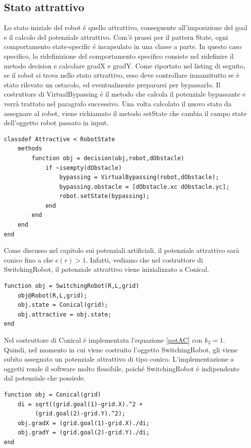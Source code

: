 \documentclass[14pt,a4paper]{extarticle}
\begin{document}
\subsection{Stato attrattivo}
Lo stato iniziale del robot é quello attrattivo, conseguente all'imposizione del goal e il calcolo del potenziale attrattivo. Com'è prassi per il pattern State, ogni comportamento state-specific é incapsulato in una classe a parte. In questo caso specifico, la ridefinizione del comportamento specifico consiste nel ridefinire il metodo decision e calcolare gradX e gradY. Come riportato nel listing di seguito, se il robot si trova nello stato attrattivo, esso deve controllare innanzitutto se è stato rilevato un ostacolo, ed eventualmente prepararsi per bypassarlo. Il costruttore di VirtualBypassing é il metodo che calcola il potenziale bypassante e verrà trattato nel paragrafo successivo. Una volta calcolato il nuovo stato da assegnare al robot, viene richiamato il metodo setState che cambia il campo state dell'oggetto robot passato in input. 
\begin{lstlisting}[caption=Classe astratta Attractive (erede di RobotState)]
classdef Attractive < RobotState
	methods
		function obj = decision(obj,robot,dObstacle)
			if ~isempty(dObstacle)
				bypassing = VirtualBypassing(robot,dObstacle);
				bypassing.obstacle = [dObstacle.xc dObstacle.yc];
				robot.setState(bypassing);
			end
		end
	end
end
\end{lstlisting}
Come discusso nel capitolo sui potenziali artificiali, il potenziale attrattivo sarà conico fino a che \(e(r) > 1\). Infatti, vediamo che nel costruttore di SwitchingRobot, il potenziale attrattivo viene inizializzato a Conical.
\begin{lstlisting}[caption=Costruttore di SwitchingRobot]
function obj = SwitchingRobot(R,L,grid)
	obj@Robot(R,L,grid);
	obj.state = Conical(grid);
	obj.attractive = obj.state;
end
\end{lstlisting}
Nel costruttore di Conical é implementata l'equazione \ref{potAC} con \(k_2=1\). Quindi, nel momento in cui viene costruito l'oggetto SwitchingRobot, gli viene subito assegnato un potenziale attrattivo di tipo conico. L'implementazione a oggetti rende il software molto flessibile, poiché SwitchingRobot é indipendente dal potenziale che possiede. 
\begin{lstlisting}[caption=Costruttore di Conical]
function obj = Conical(grid)
	di = sqrt((grid.goal(1)-grid.X).^2 +
		 (grid.goal(2)-grid.Y).^2);
	obj.gradX = (grid.goal(1)-grid.X)./di; 
	obj.gradY = (grid.goal(2)-grid.Y)./di;
end
\end{lstlisting}
\end{document}
